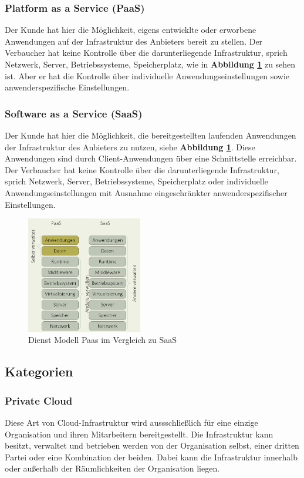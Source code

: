 \subsubsection{Platform as a Service (PaaS)} \label{PaaS} 
Der Kunde hat hier die Möglichkeit, eigens entwicklte oder erworbene Anwendungen auf der Infrastruktur des Anbieters bereit zu stellen. Der Verbaucher hat keine Kontrolle über die darunterliegende Infrastruktur, sprich Netzwerk, Server, Betriebssysteme, Speicherplatz, wie in \textbf{Abbildung \ref{fig:saas}} zu sehen ist. Aber er hat die Kontrolle über individuelle Anwendungseinstellungen sowie anwenderspezifische Einstellungen\cite{nist_definition}.

\subsubsection{Software as a Service (SaaS)} \label{SaaS}
Der Kunde hat hier die Möglichkeit, die bereitgestellten laufenden Anwendungen der Infrastruktur des Anbieters zu nutzen, siehe \textbf{Abbildung \ref{fig:saas}}. Diese Anwendungen sind durch Client-Anwendungen über eine Schnittstelle erreichbar. Der Verbaucher hat keine Kontrolle über die darunterliegende Infrastruktur, sprich Netzwerk, Server, Betriebssysteme, Speicherplatz oder individuelle Anwendungseinstellungen mit Ausnahme eingeschränkter anwenderspezifischer Einstellungen\cite{nist_definition}.

\begin{figure}[H]
	\centering
	\includegraphics[width=0.45\textwidth]{Images/SaaS}
	\caption{Dienst Modell Paas im Vergleich zu SaaS}
	\label{fig:saas}
\end{figure}

\subsection{Kategorien}
\subsubsection{Private Cloud}
Diese Art von Cloud-Infrastruktur wird aussschließlich für eine einzige Organisation und ihren Mitarbeitern bereitgestellt. Die Infrastruktur kann besitzt, verwaltet und betrieben werden von der Organisation selbst, einer dritten Partei oder eine Kombination der beiden. Dabei kann die Infrastruktur innerhalb oder außerhalb der Räumlichkeiten der Organisation liegen\cite{nist_definition}.

